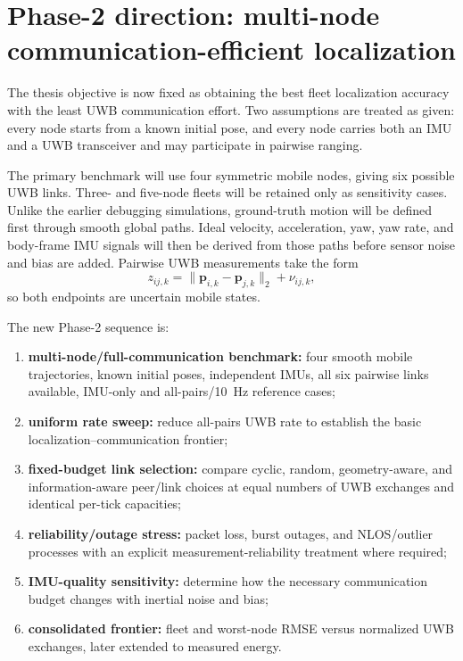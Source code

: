 \section{Phase-2 direction: multi-node communication-efficient localization}

The thesis objective is now fixed as obtaining the best fleet localization accuracy with the least UWB communication effort. Two assumptions are treated as given: every node starts from a known initial pose, and every node carries both an IMU and a UWB transceiver and may participate in pairwise ranging.

The primary benchmark will use four symmetric mobile nodes, giving six possible UWB links. Three- and five-node fleets will be retained only as sensitivity cases. Unlike the earlier debugging simulations, ground-truth motion will be defined first through smooth global paths. Ideal velocity, acceleration, yaw, yaw rate, and body-frame IMU signals will then be derived from those paths before sensor noise and bias are added. Pairwise UWB measurements take the form
\begin{equation}
    z_{ij,k}=\|\bm p_{i,k}-\bm p_{j,k}\|_2+\nu_{ij,k},
\end{equation}
so both endpoints are uncertain mobile states.

The new Phase-2 sequence is:
\begin{enumerate}
    \item \textbf{multi-node/full-communication benchmark:} four smooth mobile trajectories, known initial poses, independent IMUs, all six pairwise links available, IMU-only and all-pairs/\SI{10}{Hz} reference cases;
    \item \textbf{uniform rate sweep:} reduce all-pairs UWB rate to establish the basic localization--communication frontier;
    \item \textbf{fixed-budget link selection:} compare cyclic, random, geometry-aware, and information-aware peer/link choices at equal numbers of UWB exchanges and identical per-tick capacities;
    \item \textbf{reliability/outage stress:} packet loss, burst outages, and NLOS/outlier processes with an explicit measurement-reliability treatment where required;
    \item \textbf{IMU-quality sensitivity:} determine how the necessary communication budget changes with inertial noise and bias;
    \item \textbf{consolidated frontier:} fleet and worst-node RMSE versus normalized UWB exchanges, later extended to measured energy.
\end{enumerate}

